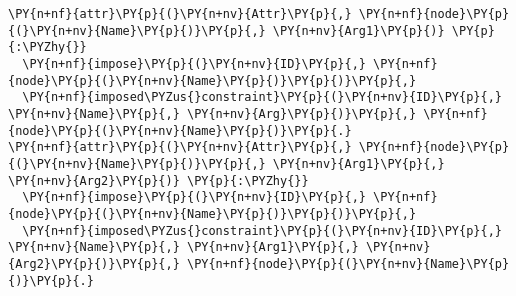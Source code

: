 \begin{Verbatim}[commandchars=\\\{\},fontsize=\footnotesize]
\PY{n+nf}{attr}\PY{p}{(}\PY{n+nv}{Attr}\PY{p}{,} \PY{n+nf}{node}\PY{p}{(}\PY{n+nv}{Name}\PY{p}{)}\PY{p}{,} \PY{n+nv}{Arg1}\PY{p}{)} \PY{p}{:\PYZhy{}}
  \PY{n+nf}{impose}\PY{p}{(}\PY{n+nv}{ID}\PY{p}{,} \PY{n+nf}{node}\PY{p}{(}\PY{n+nv}{Name}\PY{p}{)}\PY{p}{)}\PY{p}{,}
  \PY{n+nf}{imposed\PYZus{}constraint}\PY{p}{(}\PY{n+nv}{ID}\PY{p}{,} \PY{n+nv}{Name}\PY{p}{,} \PY{n+nv}{Arg}\PY{p}{)}\PY{p}{,} \PY{n+nf}{node}\PY{p}{(}\PY{n+nv}{Name}\PY{p}{)}\PY{p}{.}
\PY{n+nf}{attr}\PY{p}{(}\PY{n+nv}{Attr}\PY{p}{,} \PY{n+nf}{node}\PY{p}{(}\PY{n+nv}{Name}\PY{p}{)}\PY{p}{,} \PY{n+nv}{Arg1}\PY{p}{,} \PY{n+nv}{Arg2}\PY{p}{)} \PY{p}{:\PYZhy{}}
  \PY{n+nf}{impose}\PY{p}{(}\PY{n+nv}{ID}\PY{p}{,} \PY{n+nf}{node}\PY{p}{(}\PY{n+nv}{Name}\PY{p}{)}\PY{p}{)}\PY{p}{,}
  \PY{n+nf}{imposed\PYZus{}constraint}\PY{p}{(}\PY{n+nv}{ID}\PY{p}{,} \PY{n+nv}{Name}\PY{p}{,} \PY{n+nv}{Arg1}\PY{p}{,} \PY{n+nv}{Arg2}\PY{p}{)}\PY{p}{,} \PY{n+nf}{node}\PY{p}{(}\PY{n+nv}{Name}\PY{p}{)}\PY{p}{.}
\end{Verbatim}
